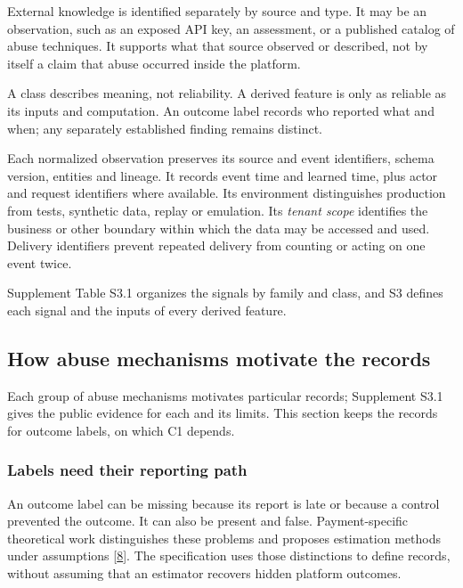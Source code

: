 \documentclass[acmlarge,nonacm]{acmart}
\begin{document}
External knowledge is identified separately by source and type. It may
be an observation, such as an exposed API key, an assessment, or a
published catalog of abuse techniques. It supports what that source
observed or described, not by itself a claim that abuse occurred inside
the platform.

A class describes meaning, not reliability. A derived feature is only as
reliable as its inputs and computation. An outcome label records who
reported what and when; any separately established finding remains
distinct.

Each normalized observation preserves its source and event identifiers,
schema version, entities and lineage. It records event time and learned
time, plus actor and request identifiers where available. Its
environment distinguishes production from tests, synthetic data, replay
or emulation. Its \emph{tenant scope} identifies the business or other
boundary within which the data may be accessed and used. Delivery
identifiers prevent repeated delivery from counting or acting on one
event twice.

Supplement Table S3.1 organizes the signals by family and class, and S3
defines each signal and the inputs of every derived feature.

\hypertarget{how-abuse-mechanisms-motivate-the-records}{%
\subsection{How abuse mechanisms motivate the
records}\label{how-abuse-mechanisms-motivate-the-records}}

Each group of abuse mechanisms motivates particular records; Supplement
S3.1 gives the public evidence for each and its limits. This section
keeps the records for outcome labels, on which C1 depends.

\hypertarget{labels-need-their-reporting-path}{%
\subsubsection*{Labels need their reporting
path}\label{labels-need-their-reporting-path}}

An outcome label can be missing because its report is late or because a
control prevented the outcome. It can also be present and false.
Payment-specific theoretical work distinguishes these problems and
proposes estimation methods under assumptions
{[}\protect\hyperlink{ref-Dhama2026Causal}{8}{]}. The specification uses
those distinctions to define records, without assuming that an estimator
recovers hidden platform outcomes.
\end{document}
